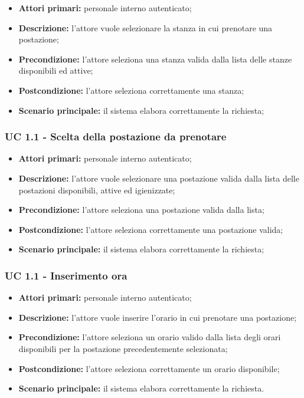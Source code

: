 \begin{itemize}
\item \textbf{Attori primari:} personale interno autenticato;
\item \textbf{Descrizione:} l'attore vuole selezionare la stanza in cui prenotare una postazione;
\item \textbf{Precondizione:} l'attore seleziona una stanza valida dalla lista delle stanze disponibili ed attive;
\item \textbf{Postcondizione:} l'attore seleziona correttamente una stanza;
\item \textbf{Scenario principale:} il sistema elabora correttamente la richiesta;
\end{itemize}

\subsubsection{UC 1.1 - Scelta della postazione da prenotare}

\begin{itemize}
\item \textbf{Attori primari:} personale interno autenticato;
\item \textbf{Descrizione:} l'attore vuole selezionare una postazione valida dalla lista delle postazioni disponibili, attive ed igienizzate;
\item \textbf{Precondizione:} l'attore seleziona una postazione valida dalla lista;
\item \textbf{Postcondizione:} l'attore seleziona correttamente una postazione valida;
\item \textbf{Scenario principale:} il sistema elabora correttamente la richiesta;
\end{itemize}

\subsubsection{UC 1.1 - Inserimento ora}

\begin{itemize}
\item \textbf{Attori primari:} personale interno autenticato;
\item \textbf{Descrizione:} l'attore vuole inserire l'orario in cui prenotare una postazione;
\item \textbf{Precondizione:} l'attore seleziona un orario valido dalla lista degli orari disponibili per la postazione precedentemente selezionata;
\item \textbf{Postcondizione:} l'attore seleziona correttamente un orario disponibile;
\item \textbf{Scenario principale:} il sistema elabora correttamente la richiesta.
\end{itemize}


